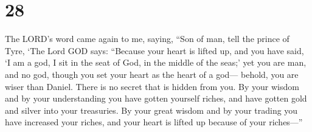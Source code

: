 \hypertarget{section-26}{%
\section{28}\label{section-26}}

 The LORD's word came again to me, saying, 
``Son of man, tell the prince of Tyre, `The Lord GOD says: ``Because
your heart is lifted up, and you have said, `I am a god, I sit in the
seat of God, in the middle of the seas;' yet you are man, and no god,
though you set your heart as the heart of a god---  behold,
you are wiser than Daniel. There is no secret that is hidden from you.
 By your wisdom and by your understanding you have gotten
yourself riches, and have gotten gold and silver into your treasuries.
 By your great wisdom and by your trading you have increased
your riches, and your heart is lifted up because of your riches---''

